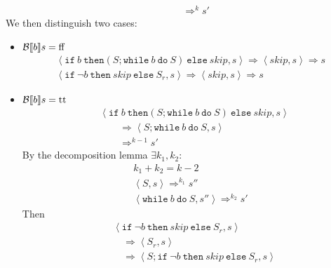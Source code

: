 \begin{exercise}
\begin{itemize}
\begin{itemize}
\begin{align*}
                    \\&\qquad\Rightarrow^k s'
                \end{align*}
                We then distinguish two cases:
                \begin{itemize}
                    \item $\mathcal{B} \llbracket  b \rrbracket s = \text{ff}$
                    \begin{gather*}
                        \left<\texttt{if}\ b\ \texttt{then} (S; \texttt{while}\ b\ \texttt{do}\ S)\ \texttt{else}\ skip, s\right>
                        \Rightarrow
                        \left<skip, s\right>
                        \Rightarrow s
                        \\
                        \left<\texttt{if}\ \neg b\ \texttt{then}\ skip\ \texttt{else}\ S_r, s\right>
                        \Rightarrow
                        \left<skip, s\right>
                        \Rightarrow s
                    \end{gather*}
                    \item $\mathcal{B} \llbracket  b \rrbracket s = \text{tt}$
                        \begin{align*}
                            &\left<\texttt{if}\ b\ \texttt{then} (S; \texttt{while}\ b\ \texttt{do}\ S)\ \texttt{else}\ skip, s\right>
                            \\&\qquad\Rightarrow \left<S; \texttt{while}\ b\ \texttt{do}\ S, s\right>
                            \\&\qquad\Rightarrow^{k-1} s'
                        \end{align*}
                        By the decomposition lemma $\exists k_1, k_2 :$
                        \begin{gather*}
                            k_1 + k_2 = k - 2 \\
                            \left<S, s\right> \Rightarrow^{k_1} s'' \\
                            \left<\texttt{while}\ b\ \texttt{do}\ S, s''\right> \Rightarrow^{k_2} s'
                        \end{gather*}
                        Then
                        \begin{align*}
                            &\left<\texttt{if}\ \neg b\ \texttt{then}\ skip\ \texttt{else}\ S_r, s\right>
                            \\&\quad\Rightarrow \left<S_r, s\right>
                            \\&\quad\Rightarrow \left<S; \texttt{if}\ \neg b\ \texttt{then}\ skip\ \texttt{else}\ S_r, s\right>

\end{align*}
\end{itemize}
\end{itemize}
\end{itemize}
\end{exercise}
